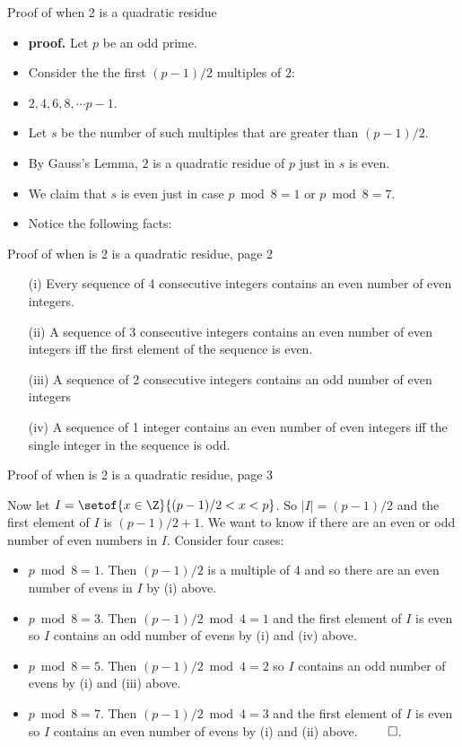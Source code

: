 \documentclass{beamer}
\begin{document}
\begin{frame}{Proof of when 2 is a quadratic residue}

\begin{itemize}
  \item \textbf{proof.}  Let $p$ be an odd prime.
  \item Consider the the first $(p-1)/2$ multiples of $2$:
  \item  $2, 4, 6, 8, \cdots p-1$.
  \item Let $s$ be the number of such multiples that are greater than $(p-1)/2$.
  \item By Gauss's Lemma, $2$ is a quadratic residue of $p$ just in $s$ is even.
  \item We claim that $s$ is even just in case $p\bmod 8 = 1$ or $p\bmod 8 = 7$.
  \item Notice the following facts:
\end{itemize}

\end{frame}

\begin{frame}{Proof of when is 2 is a quadratic residue, page 2}

\begin{enumerate}
\item[(i)] Every sequence of 4 consecutive integers contains an even number of even integers.
\item[(ii)] A sequence of 3 consecutive integers contains an even number of even integers iff the first element of the sequence is even.
\item[(iii)] A sequence of 2 consecutive integers contains an odd number of even integers
\item[(iv)] A sequence of 1 integer contains an even number of even integers iff the single integer in the sequence is odd.
\end{enumerate}

\end{frame}

\begin{frame}{Proof of when is 2 is a quadratic residue, page 3}

Now let $I=\setof{x\in\Z}{(p-1)/2 < x < p}$. So $|I|=(p-1)/2$ and the first element of $I$ is $(p-1)/2 + 1$.
We want to know if there are an even or odd number of even numbers in $I$.
Consider four cases:

\begin{itemize}
\item $p\bmod 8 = 1$. Then $(p-1)/2$ is a multiple of 4 and so there are an even number of evens in $I$ by (i) above.
\item $p\bmod 8 = 3$. Then $(p-1)/2 \bmod 4 = 1$ and the first element of $I$ is even so $I$ contains an odd number of evens by (i) and (iv) above.
\item $p\bmod 8 = 5$. Then $(p-1)/2 \bmod 4 = 2$ so $I$ contains an odd number of evens by (i) and (iii) above.
\item $p\bmod 8 = 7$. Then $(p-1)/2 \bmod 4 = 3$ and the first element of $I$ is even so $I$ contains an even number of evens by (i) and (ii) above. $\qed$.
\end{itemize}

\end{frame}
\end{document}
